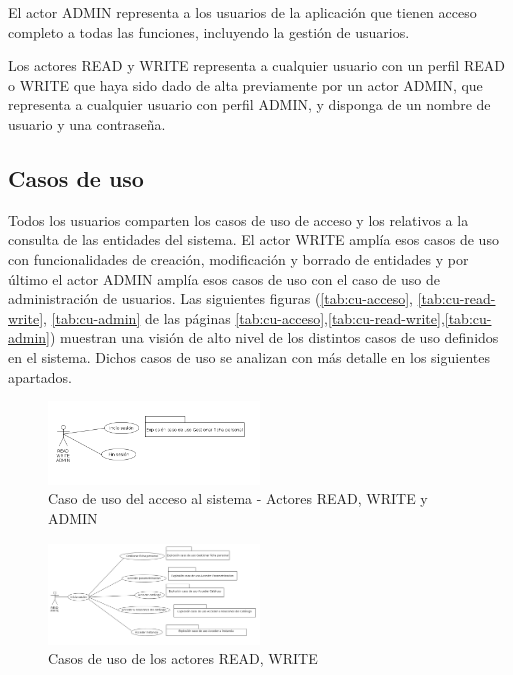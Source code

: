 El actor ADMIN representa a los usuarios de la aplicación que tienen
acceso completo a todas las funciones, incluyendo la gestión de usuarios.

Los actores  READ y  WRITE representa a cualquier usuario con un perfil READ o WRITE que haya sido dado de alta previamente por un actor ADMIN, que representa a cualquier usuario con perfil ADMIN, y disponga de un nombre de usuario y una contraseña.




\subsection{Casos de uso}
\label{sub:casos-uso}


Todos los usuarios comparten los casos de uso de acceso y los relativos a la consulta de las entidades del sistema. El actor WRITE amplía esos casos de uso con funcionalidades de creación, modificación y borrado de entidades y por último el actor ADMIN amplía esos casos de uso con el caso de uso de administración de usuarios. Las siguientes figuras (\ref{tab:cu-acceso}, \ref{tab:cu-read-write}, \ref{tab:cu-admin} de las páginas \ref{tab:cu-acceso},\ref{tab:cu-read-write},\ref{tab:cu-admin}) muestran una visión de alto nivel de los distintos casos de uso definidos en el sistema. Dichos casos de uso se analizan con más detalle en los siguientes apartados.


\begin{figure}[hp!]
  \centering
  \includegraphics[width=0.50\textwidth]{imaxes/cu_acceso.png}
  \caption{Caso de uso del acceso al sistema - Actores READ, WRITE y ADMIN}
  \label{fig:cu-acceso}
\end{figure}



\begin{figure}[hp!]
  \centering
  \includegraphics[width=0.50\textwidth]{imaxes/cu-read-write.png}
  \caption{Casos de uso de los actores READ, WRITE}
  \label{fig:cu-read-write}
\end{figure}


